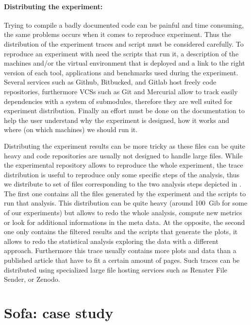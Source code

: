 \paragraph{Distributing the experiment:}

Trying to compile a badly documented code can be painful and time consuming,
the same problems occurs when it comes to reproduce experiment. Thus the
distribution of the experiment traces and script must be considered carefully.
To reproduce an experiment with need the scripts that run it, a description of
the machines and/or the virtual environment that is deployed and a link to the
right version of each tool, applications and benchmarks used during the
experiment. Several services such as Github, Bitbucked, and Gitlab 
host freely code repositories, furthermore \glspl{VCS} such as Git and
Mercurial  allow to track easily dependencies with a system
of submodules, therefore they are well suited for experiment distribution.
Finally an effort must be done on the documentation to help the user
understand why the experiment is designed, how it works and where (on which
machines) we should run it.

Distributing the experiment results can be more tricky as these files can be
quite heavy and code repositories are usually not designed to handle large
files. While the experimental repository allows to reproduce the whole
experiment, the trace distribution is useful to reproduce only some specific
steps of the analysis, thus we distribute to set of files corresponding to the
two analysis steps depicted in . The first one contains all
the files generated by the experiment and the scripts to run that analysis.
This distribution can be quite heavy (around \SI{100}{Gib} for some of our
experiments) but allows to redo the whole analysis, compute new metrics or
look for additional informations in the meta data. At the opposite, the second
one only contains the filtered results and the scripts that generate the
plots, it allows to redo the statistical analysis exploring the data with a
different approach. Furthermore this trace usually contains more plots and
data than a published article that have to fit a certain amount of pages. Such
traces can be distributed using specialized large file hosting services such
as Renater File Sender, or Zenodo.


\section{Sofa: case study}

